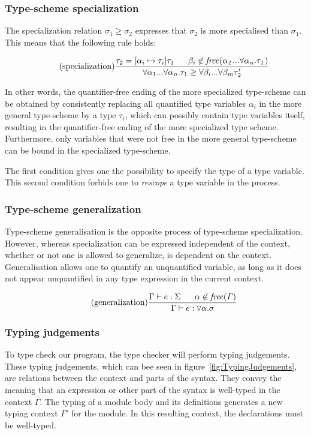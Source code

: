 \documentclass[10pt,a4paper]{report}
\begin{document}
\subsubsection{Type-scheme specialization}
The specialization relation $\sigma_{1} \geq \sigma_{2}$ expresses that $\sigma_{2}$ is more specialised than $\sigma_{1}$. This means that the following rule holds:
%

\[
\tag{specialization}
\frac{\tau_{2}=[\alpha_{i} \mapsto \tau_{i}]\tau_{1} \;\;\;\;\;\; \beta_{i} \not\in\mathit{free(\alpha_{1}...\forall \alpha_{n}.\tau_{1})}}
{\forall\alpha_{1}...\forall\alpha_{n}.\tau_{1}\geq \forall \beta_{i}...\forall \beta_{m}\tau_{2}'}
\]

In other words, the quantifier-free ending of the more specialized type-scheme can be obtained by consistently replacing all quantified type variables $\alpha_{i}$ in the more general type-scheme by a type $\tau_{i}$, which can possibly contain type variables itself, resulting in the quantifier-free ending of the more specialized type scheme. Furthermore, only variables that were not free in the more general type-scheme can be bound in the specialized type-scheme.

The first condition gives one the possibility to specify the type of a type variable. This second condition forbids one to \emph{rescope} a type variable in the process.

\subsubsection{Type-scheme generalization}
Type-scheme generalisation is the opposite process of type-scheme specialization. However, whereas specialization can be expressed independent of the context, whether or not one is allowed to generalize, is dependent on the context. Generalisation allows one to quantify an unquantified variable, as long as it does not appear unquantified in any type expression in the current context.

\[
\tag{generalization}
\frac{\Gamma \vdash e:\Sigma \;\;\;\;\;\; \alpha \not\in \mathit{free(\Gamma)}}{\Gamma \vdash e : \forall \alpha . \sigma}
\]


\subsubsection{Typing judgements}
To type check our program, the type checker will perform typing judgements. These typing judgements, which can bee seen in figure~\ref{fig:TypingJudgements}, are relations between the context and parts of the syntax. They convey the meaning that an expression or other part of the syntax is well-typed in the context $\Gamma$. The typing of a module body and its definitions generates a new typing context $\Gamma'$ for the module. In this resulting context, the declarations must be well-typed.
\end{document}
